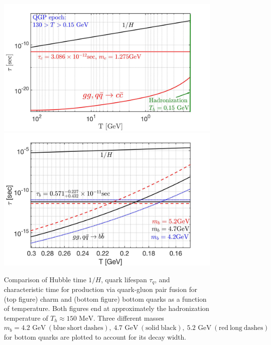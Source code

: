 \documentclass[universe,article,submit,moreauthors,pdftex,a4paper]{Definitions/mdpi}
\newcommand{\GeV}{\text{ GeV}}
\newcommand{\MeV}{\text{ MeV}}
\begin{document}
\begin{figure} %
\begin{center}
\includegraphics[width=\textwidth]{./plots/CharmQuark_QGP.jpg}\\
\includegraphics[width=\textwidth]{./plots/BQuarkReactionTime_bottom.jpg}
\caption{Comparison of Hubble time $1/H$, quark lifespan $\tau_{q}$, and characteristic time for production via quark-gluon pair fusion for (top figure) charm and (bottom figure) bottom quarks as a function of temperature. Both figures end at approximately the hadronization temperature of $T_{h}\approx150\MeV$. Three different masses $m_{b}={4.2\GeV\ \mathrm{(blue\ short\ dashes)},\ 4.7\GeV\ \mathrm{(solid\ black)},\ 5.2\GeV\ \mathrm{(red\ long\ dashes)}}$ for bottom quarks are plotted to account for its decay width.}
\label{BCreaction_fig}
\end{center}
\end{figure}
\end{document}
